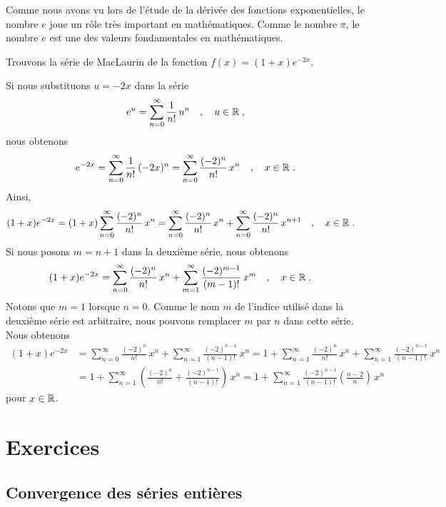 {Comme nous avons vu lors de l'étude de la dérivée des fonctions
exponentielles, le nombre $e$ joue un rôle très important en
mathématiques.  Comme le nombre $\pi$, le nombre $e$ est une des
valeurs fondamentales en mathématiques.

\begin{egg}
Trouvons la série de MacLaurin de la fonction $f(x) = (1+x)e^{-2x}$.

Si nous substituons $u=-2x$ dans la série
\[
e^u= \sum_{n=0}^\infty \frac{1}{n!}\, u^n \quad , \quad u \in \mathbb{R}
\; ,
\]
nous obtenons
\[
e^{-2x} = \sum_{n=0}^\infty \frac{1}{n!}\, (-2x)^n
= \sum_{n=0}^\infty \frac{(-2)^n}{n!}\, x^n \quad , \quad x \in \mathbb{R} \; .
\]
Ainsi,
\begin{align*}
(1+x)e^{-2x} &= (1+x) \sum_{n=0}^\infty \frac{(-2)^n}{n!}\, x^n
= \sum_{n=0}^\infty \frac{(-2)^n}{n!}\, x^n +
\sum_{n=0}^\infty \frac{(-2)^n}{n!}\, x^{n+1} \quad , \quad x \in \mathbb{R} \; .
\end{align*}
Si nous posons $m=n+1$ dans la deuxième série, nous obtenons
\begin{align*}
(1+x)e^{-2x} &= \sum_{n=0}^\infty \frac{(-2)^n}{n!}\, x^n +
\sum_{m=1}^\infty \frac{(-2)^{m-1}}{(m-1)!}\, x^m  \quad , \quad x \in
\mathbb{R} \; .
\end{align*}
Notons que $m=1$ lorsque $n=0$.  Comme le nom $m$ de l'indice utilisé dans
la deuxième série est arbitraire, nous pouvons remplacer $m$ par $n$ dans cette
série.  Nous obtenons
\begin{align*}
(1+x)e^{-2x} &= \sum_{n=0}^\infty \frac{(-2)^n}{n!}\, x^n +
\sum_{n=1}^\infty \frac{(-2)^{n-1}}{(n-1)!}\, x^n
=  1 + \sum_{n=1}^\infty \frac{(-2)^n}{n!}\, x^n +
\sum_{n=1}^\infty \frac{(-2)^{n-1}}{(n-1)!}\, x^n \\
&=  1 + \sum_{n=1}^\infty \left( \frac{(-2)^n}{n!} +
\frac{(-2)^{n-1}}{(n-1)!} \right)\, x^n
=  1 + \sum_{n=1}^\infty \frac{(-2)^{n-1}}{(n-1)!} \left(
\frac{n-2}{n} \right)\, x^n
\end{align*}
pour $x \in \mathbb{R}$.
\end{egg}

}  %

\section{Exercices}

\subsection{Convergence des séries entières}

